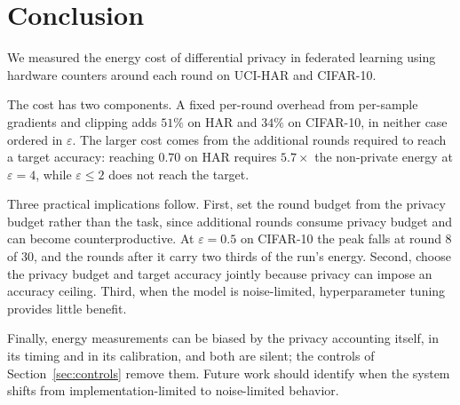 \section{Conclusion}

 We measured the energy cost of differential privacy in federated learning using hardware counters around each round on UCI-HAR and CIFAR-10.

 The cost has two components. A fixed per-round overhead from per-sample gradients and clipping adds $51\%$ on HAR and $34\%$ on CIFAR-10, in neither case ordered in $\varepsilon$. The larger cost comes from the additional rounds required to reach a target accuracy: reaching $0.70$ on HAR requires $5.7\times$ the non-private energy at $\varepsilon=4$, while $\varepsilon\le2$ does not reach the target.

 Three practical implications follow. First, set the round budget from the privacy budget rather than the task, since additional rounds consume privacy budget and can become counterproductive. At $\varepsilon=0.5$ on CIFAR-10 the peak falls at round 8 of 30, and the rounds after it carry two thirds of the run's energy. Second, choose the privacy budget and target accuracy jointly because privacy can impose an accuracy ceiling. Third, when the model is noise-limited, hyperparameter tuning provides little benefit.

 Finally, energy measurements can be biased by the privacy accounting itself, in its timing and in its calibration, and both are silent; the controls of Section~\ref{sec:controls} remove them. Future work should identify when the system shifts from implementation-limited to noise-limited behavior.
